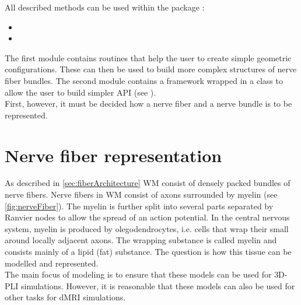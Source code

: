 % 
All described methods can be used within the package :
% 
\begin{itemize}[nosep]
    \item {}
    \item {}
\end{itemize}
% 
The first module  contains routines that help the user to create simple geometric configurations.
These can then be used to build more complex structures of nerve fiber bundles.
The second module  contains a \CXX framework wrapped in a \python class to allow the user to build simpler \ac{API} (see \dummy).
\\
% 
First, however, it must be decided how a nerve fiber and a nerve bundle is to be represented.
% 
% 
% 
\section{Nerve fiber representation}
\label{sec:nerve_fiber_representation}
% 
As described in \cref{sec:fiberArchitecture} \ac{WM} consist of densely packed bundles of nerve fibers.
Nerve fibers in \ac{WM} consist of axons surrounded by myelin (see \cref{fig:nerveFiber}).
The myelin is further split into several parts separated by Ranvier nodes to allow the spread of an action potential.
In the central nervous system, myelin is produced by olegodendrocytes, i.e. cells that wrap their small  around locally adjacent axons.
The wrapping substance is called myelin and consists mainly of a lipid (fat) substance.
The question is how this tissue can be modelled and represented.
\\
% 
The main focus of modeling is to ensure that these models can be used for \ac{3D-PLI} simulations.
However, it is reasonable that these models can also be used for other tasks \eg for \ac{dMRI} simulations.
% 
